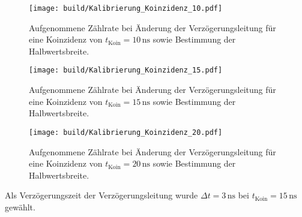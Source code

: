 \begin{figure}[H] %
    \centering
    \texttt{[image: build/Kalibrierung\_Koinzidenz\_10.pdf]}
    \caption{Aufgenommene Zählrate bei Änderung der Verzögerungsleitung für eine Koinzidenz von $t_\text{Koin} = 10 \, \unit{\nano\second}$ sowie Bestimmung der Halbwertsbreite.}
    \label{fig:koin_10}
\end{figure}

\begin{figure}[H] %
    \centering
    \texttt{[image: build/Kalibrierung\_Koinzidenz\_15.pdf]}
    \caption{Aufgenommene Zählrate bei Änderung der Verzögerungsleitung für eine Koinzidenz von $t_\text{Koin} = 15 \, \unit{\nano\second}$ sowie Bestimmung der Halbwertsbreite.}
    \label{fig:koin_15}
\end{figure}

\begin{figure}[H] %
    \centering
    \texttt{[image: build/Kalibrierung\_Koinzidenz\_20.pdf]}
    \caption{Aufgenommene Zählrate bei Änderung der Verzögerungsleitung für eine Koinzidenz von $t_\text{Koin} = 20 \, \unit{\nano\second}$ sowie Bestimmung der Halbwertsbreite.}
    \label{fig:koin_20}
\end{figure}

Als Verzögerungszeit der Verzögerungsleitung wurde $\Delta t = 3 \,\unit{\nano\second}$ bei $t_\text{Koin} = 15 \, \unit{\nano\second}$ gewählt.


